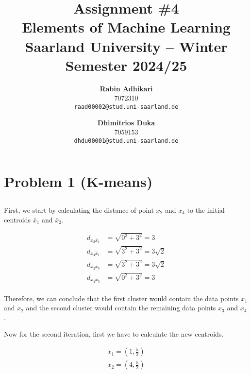 \documentclass{article}
\title{Assignment \#4\\
  \vspace{2mm}
  \small{Elements of Machine Learning}
  \\
  \vspace{2mm}
  \small{Saarland University -- Winter Semester 2024/25}
}
\author{%
\textbf{Rabin Adhikari} \\
  7072310 \\
  \texttt{raad00002@stud.uni-saarland.de} \\
  \and
  \textbf{Dhimitrios Duka} \\
 7059153 \\
  \texttt{dhdu00001@stud.uni-saarland.de} \\
}
\begin{document}
\maketitle

\section{Problem 1 (K-means)}
\subsection{}

First, we start by calculating the distance of point $x_2$ and $x_4$ to the initial centroids $\bar{x}_1$ and $\bar{x}_2$. 

\begin{equation}
  \begin{aligned}
    d_{x_2\bar{x}_1} &= \sqrt{0^2 + 3^2} = 3 \\
    d_{x_4\bar{x}_1} &= \sqrt{3^2 + 3^2} = 3\sqrt{2} \\
    d_{x_2\bar{x}_3} &= \sqrt{3^2 + 3^2} = 3\sqrt{2} \\
    d_{x_4\bar{x}_3} &= \sqrt{0^2 + 3^2} = 3 \\
  \end{aligned}
\end{equation}

Therefore, we can conclude that the first cluster would contain the data points $x_1$ and $x_2$ and the second cluster would contain the remaining data points $x_3$ and $x_4$.

Now for the second iteration, first we have to calculate the new centroids. 

\begin{equation}
  \begin{aligned}
    \bar{x}_1 = (1, \frac{5}{2}) \\
    \bar{x}_2 = (4, \frac{5}{2})
  \end{aligned}
\end{equation}
\end{document}
